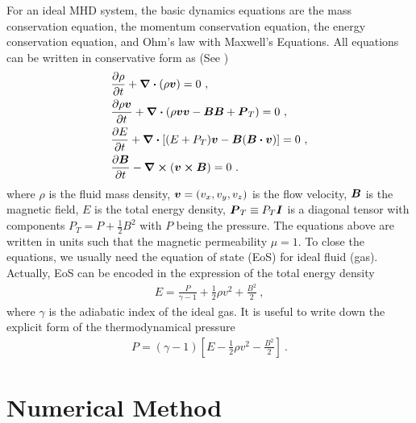 \documentclass[10.5pt]{article}
\begin{document}
For an ideal MHD system,
the basic dynamics equations are the mass conservation equation, 
the momentum conservation equation, the energy conservation equation, 
and Ohm's law with Maxwell's Equations. All equations can be written in conservative form as
 (See \cite{stone2008athena})
 \begin{align}
 	&\pdv{\rho}{t}+\div (\rho \vb*{v})=0 \ , \\
	&\pdv{\rho \vb*{v}}{t} +\div (\rho \vb*{v}\vb*{v}-\vb*{B}\vb*{B}+\vb*{P}_T)=0 \ , \\
	&\pdv{E}{t} + \div [(E+P_T)\vb*{v}-\vb*{B}(\vb*{B}\vdot\vb*{v})]=0 \ , \\
	&\pdv{\vb*{B}}{t}-\curl (\vb*{v} \cross \vb*{B})=0 \ .
 \end{align}
 where $\rho$ is the fluid mass density, $\vb*{v}=(v_x,v_y,v_z)$ is the flow velocity, $\vb*{B}$ is the magnetic field, 
 $E$ is the total energy density,
 $\vb*{P}_T \equiv P_T \vb*{I}$ is a diagonal tensor with components 
 $P_T=P+\frac{1}{2}B^2$ with $P$ being the pressure. The equations above are written in 
 units such that the magnetic permeability $\mu=1$.
To close the equations, we usually need the equation of state (EoS) for ideal fluid (gas). 
Actually, EoS can be encoded in the expression of the total energy density 
\begin{align}
	E=\frac{P}{\gamma-1}+\frac{1}{2}\rho v^2+\frac{B^2}{2} \ ,
\end{align}
where $\gamma$ is the adiabatic index of the ideal gas.
It is useful to write down the explicit form of the thermodynamical pressure
\begin{align}
	P=(\gamma-1)\left[E-\frac{1}{2}\rho v^2-\frac{B^2}{2}\right] \ .
\end{align}

\section{Numerical Method}
\end{document}
